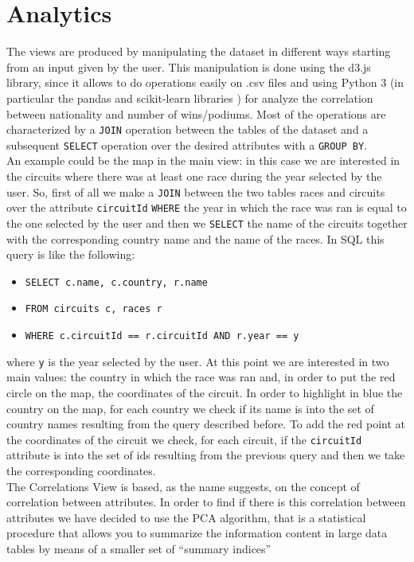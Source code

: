 \documentclass[11pt,twocolumn,letterpaper]{article}
\begin{document}
\section{Analytics}
The views are produced by manipulating the dataset in different ways starting from an input given by the user. This manipulation is done using the d3.js \cite{D3} library,
since it allows to do operations easily on .csv files and using Python 3 (in particular the pandas \cite{Pandas} and scikit-learn libraries \cite{Scikit-learn}) 
for analyze the correlation between nationality and number of wins/podiums. Most of the operations are characterized by a \texttt{JOIN} operation between the tables of the 
dataset and a subsequent \texttt{SELECT} operation over the desired attributes with a \texttt{GROUP BY}.\\
An example could be the map in the main view: in this case we are interested in the circuits where there was at least one race during the year selected by the user. So, first
of all we make a \texttt{JOIN} between the two tables races and circuits over the attribute \texttt{circuitId} \texttt{WHERE} the year in which the race was ran is equal to the
one selected by the user and then we \texttt{SELECT} the name of the circuits together with the corresponding country name and the name of the races. In SQL this query is like the
following:
\begin{itemize}
	\item \texttt{SELECT c.name, c.country, r.name}
	\item \texttt{FROM circuits c, races r}
	\item \texttt{WHERE c.circuitId == r.circuitId AND r.year == y}
\end{itemize}
where \texttt{y} is the year selected by the user.
At this point we are interested in two main values: the country in which the race was ran and, in order to put the red circle on the map, the coordinates of the circuit. In order to
highlight in blue the country on the map, for each country we check if its name is into the set of country names resulting from the query described before. To add the red point
at the coordinates of the circuit we check, for each circuit, if the \texttt{circuitId} attribute is into the set of ids resulting from the previous query and then we take the
corresponding coordinates.\\
The Correlations View is based, as the name suggests, on the concept of correlation between attributes. In order to find if there is this correlation between attributes we have
decided to use the PCA algorithm, that is a statistical procedure that allows you to summarize the information content in large data tables by means of a smaller set of “summary indices” 
\end{document}
